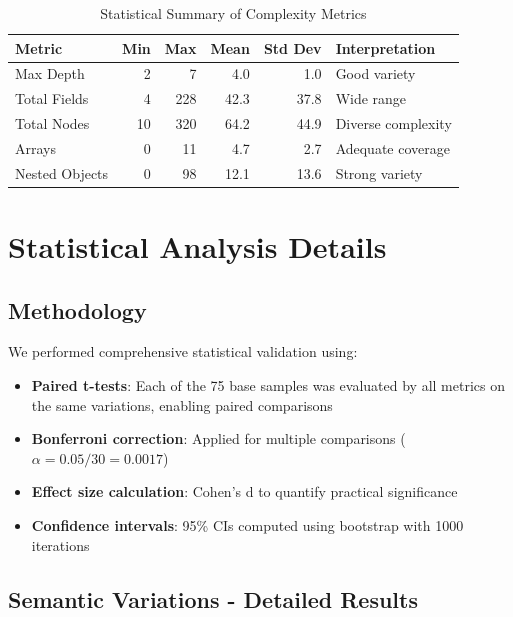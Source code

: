 \documentclass{article}
\begin{document}
\begin{table}[H]
\centering
\caption{Statistical Summary of Complexity Metrics}
\label{tab:complexity-summary-appendix}
\begin{tabular}{lrrrrl}
\toprule
\textbf{Metric} & \textbf{Min} & \textbf{Max} & \textbf{Mean} & \textbf{Std Dev} & \textbf{Interpretation} \\
\midrule
Max Depth & 2 & 7 & 4.0 & 1.0 & Good variety \\
Total Fields & 4 & 228 & 42.3 & 37.8 & Wide range \\
Total Nodes & 10 & 320 & 64.2 & 44.9 & Diverse complexity \\
Arrays & 0 & 11 & 4.7 & 2.7 & Adequate coverage \\
Nested Objects & 0 & 98 & 12.1 & 13.6 & Strong variety \\
\bottomrule
\end{tabular}
\end{table}

\section{Statistical Analysis Details}
\label{sec:statistical-analysis}

\subsection{Methodology}

We performed comprehensive statistical validation using:
\begin{itemize}
\item \textbf{Paired t-tests}: Each of the 75 base samples was evaluated by all metrics on the same variations, enabling paired comparisons
\item \textbf{Bonferroni correction}: Applied for multiple comparisons ($\alpha = 0.05/30 = 0.0017$)
\item \textbf{Effect size calculation}: Cohen's d to quantify practical significance
\item \textbf{Confidence intervals}: 95\% CIs computed using bootstrap with 1000 iterations
\end{itemize}

\subsection{Semantic Variations - Detailed Results}
\end{document}
